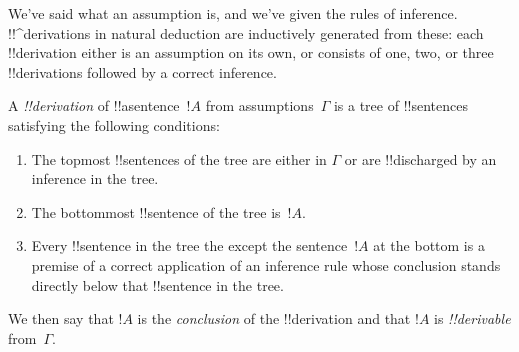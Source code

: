 \documentclass[../../../include/open-logic-section]{subfiles}
\begin{document}
      {}
      {}


\begin{explain}
We've said what an assumption is, and we've given the rules of
inference.  !!^{derivation}s in natural deduction are inductively
generated from these: each !!{derivation} either is an assumption
on its own, or consists of one, two, or three !!{derivation}s followed
by a correct inference.
\end{explain}

\begin{defn}[!!^{derivation}]
A \emph{!!{derivation}} of !!a{sentence}~$!A$ from assumptions~$\Gamma$
is a tree of !!{sentence}s satisfying the following conditions:
\begin{enumerate}
\item The topmost !!{sentence}s of the tree are either in $\Gamma$ or
  are !!{discharged} by an inference in the tree.
\item The bottommost !!{sentence} of the tree is~$!A$.
\item Every !!{sentence} in the tree the except the sentence~$!A$ at
  the bottom is a premise of a correct application of an inference
  rule whose conclusion stands directly below that !!{sentence} in the
  tree.
\end{enumerate}
We then say that $!A$ is the \emph{conclusion} of the
!!{derivation} and that $!A$ is \emph{!!{derivable}} from~$\Gamma$.
\end{defn}
\end{document}
